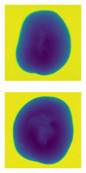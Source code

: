 \documentclass[11pt]{article}
\begin{document}
\begin{figure}[!h]
\begin{subfigure}[b]{0.22\textwidth}
         \caption{}
         \label{fig:hollow_5}
     \end{subfigure}
     \hfill
     \begin{subfigure}[b]{0.22\textwidth}
         \centering
         \includegraphics[width=\textwidth]{figurer/potato_dataset/hollow/hollow_6.jpg}
         \caption{}
         \label{fig:hollow_6}
     \end{subfigure}
     \hfill
     \begin{subfigure}[b]{0.22\textwidth}
         \centering
         \includegraphics[width=\textwidth]{figurer/potato_dataset/hollow/hollow_7.jpg}

\end{subfigure}
\end{figure}
\end{document}

